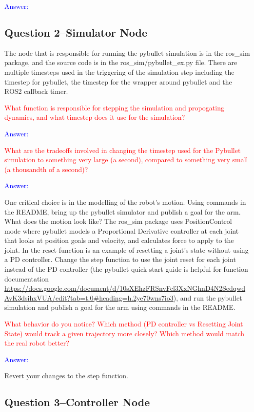 \documentclass[11pt,a4paper]{article}
\begin{document}
\textcolor{blue}{Answer: }

\subsection{Question 2--Simulator Node}

The node that is responsible for running the pybullet simulation is in the ros\_sim package, and the source code is in the ros\_sim/pybullet\_ex.py file. There are multiple timesteps used in the triggering of the simulation step including the timestep for pybullet, the timestep for the wrapper around pybullet and the ROS2 callback timer. 

\textcolor{red}{What function is responsible for stepping the simulation and propogating dynamics, and what timestep does it use for the simulation?}

\textcolor{blue}{Answer: }


\textcolor{red}{What are the tradeoffs involved in changing the timestep used for the Pybullet simulation to something very large (a second), compared to something very small (a thousandth of a second)?}

\textcolor{blue}{Answer: }

One critical choice is in the modelling of the robot's motion. Using commands in the README, bring up the pybullet simulator and publish a goal for the arm. What does the motion look like? The ros\_sim package uses PositionControl mode where pybullet models a Proportional Derivative controller at each joint that looks at position goals and velocity, and calculates force to apply to the joint. In the reset function is an example of resetting a joint's state without using a PD controller. Change the step function to use the joint reset for each joint instead of the PD controller (the pybullet quick start guide is helpful for function documentation \url{https://docs.google.com/document/d/10sXEhzFRSnvFcl3XxNGhnD4N2SedqwdAvK3dsihxVUA/edit?tab=t.0#heading=h.2ye70wns7io3}), and run the pybullet simulation and publish a goal for the arm using commands in the README.

\textcolor{red}{ What behavior do you notice? Which method (PD controller vs Resetting Joint State) would track a given trajectory more closely? Which method would match the real robot better?}

\textcolor{blue}{Answer: }

Revert your changes to the step function.

\subsection{Question 3--Controller Node}
\end{document}
